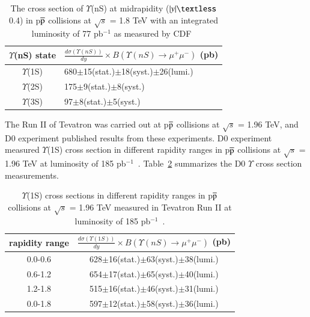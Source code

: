 \begin{table}
  \begin{center}
    \caption[]{The cross section of $\Upsilon$(nS) at midrapidity
($|y|\textless$ 0.4) in p$\overline{\rm p}$ collisions at $\surd s$ = 1.8 TeV with
an integrated luminosity of 77 pb$^{-1}$ as measured by CDF~\cite{CDF:2001fdy}}
\label{Tab:YCrossCDF02}
\begin{tabular}{cl} 
\hline 
\hline
$\Upsilon$(nS) state             &$\frac{d\sigma(\Upsilon(nS))}{dy}\times B(\Upsilon(nS)\rightarrow\mu^{+}\mu^{-})$ (pb)    \\              
\hline
$\Upsilon$(1S)                   &680$\pm$15(stat.)$\pm$18(syst.)$\pm$26(lumi.)\\
$\Upsilon$(2S)                   &175$\pm$9(stat.)$\pm$8(syst.)\\
$\Upsilon$(3S)                   &97$\pm$8(stat.)$\pm$5(syst.)\\   
\hline
\hline
\end{tabular}
\end{center}
\end{table}

The Run II of Tevatron was carried out at p$\overline{\rm p}$ collisions at
$\surd s$ = 1.96 TeV, and D0 experiment published results from these
experiments.
D0 experiment measured $\Upsilon$(1S) cross section in different 
rapidity ranges in p$\overline{\rm p}$ collisions at $\surd s$  = 1.96 TeV 
at luminosity of 185 pb$^{-1}$~\cite{D0:2005klj}.
Table~\ref{Tab:YCrossD0RunII} summarizes the D0 $\Upsilon$ cross section
measurements.


\begin{table}
 \begin{center}
   \caption[]{ $\Upsilon$(1S) cross sections in different rapidity ranges in p$\overline{\rm p}$
    collisions at $\surd s$ = 1.96 TeV measured in 
    Tevatron Run II at luminosity of 185 pb$^{-1}$~\cite{D0:2005klj}. }
\label{Tab:YCrossD0RunII}
\begin{tabular}{cc} 
\hline 
\hline
rapidity range             &$\frac{d\sigma(\Upsilon(1S))}{dy}\times B(\Upsilon(nS)\rightarrow\mu^{+}\mu^{-})$ (pb)    \\              
\hline
0.0-0.6                   &628$\pm$16(stat.)$\pm$63(syst.)$\pm$38(lumi.)\\
0.6-1.2                   &654$\pm$17(stat.)$\pm$65(syst.)$\pm$40(lumi.)\\
1.2-1.8                   &515$\pm$16(stat.)$\pm$46(syst.)$\pm$31(lumi.)\\
0.0-1.8                   &597$\pm$12(stat.)$\pm$58(syst.)$\pm$36(lumi.)\\
\hline
\hline
\end{tabular}
\end{center}
\end{table}

